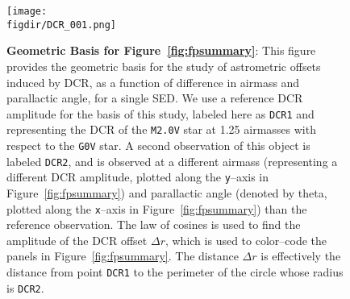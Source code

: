 \documentclass[prd, nofootinbib, floatfix, 11pt, tightenlines, times]{article}
\def\figdir{../figures}
\begin{document}
\begin{figure}[!ht]
  \centering
  \texttt{[image: \\figdir/DCR\_001.png]} 
  \caption{{\bf Geometric Basis for Figure~\ref{fig:fpsummary}}: This
    figure provides the geometric basis for the study of astrometric
    offsets induced by DCR, as a function of difference in airmass and
    parallactic angle, for a single SED.  We use a reference DCR
    amplitude for the basis of this study, labeled here as {\tt DCR1}
    and representing the DCR of the {\tt M2.0V} star at 1.25 airmasses
    with respect to the {\tt G0V} star.  A second observation of this
    object is labeled {\tt DCR2}, and is observed at a different
    airmass (representing a different DCR amplitude, plotted along the
    {\tt y}--axis in Figure~\ref{fig:fpsummary}) and parallactic angle
    (denoted by theta, plotted along the {\tt x}--axis in
    Figure~\ref{fig:fpsummary}) than the reference observation.  The
    law of cosines is used to find the amplitude of the DCR offset
    $\Delta r$, which is used to color--code the panels in
    Figure~\ref{fig:fpsummary}.  The distance $\Delta r$ is
    effectively the distance from point {\tt DCR1} to the perimeter of
    the circle whose radius is {\tt DCR2}.}
  \label{fig:fpgeom}
\end{figure}
\end{document}
